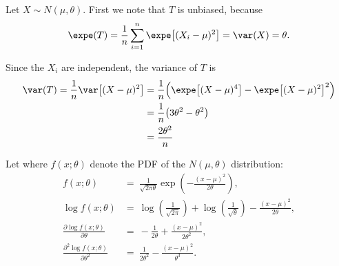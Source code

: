 \begin{solution}
Let $X\sim N(\mu,\theta)$. First we note that $T$ is unbiased, because
\[
\expe(T) = \frac{1}{n}\sum_{i=1}^{n} \expe\big[(X_i-\mu)^2\big] = \var(X) = \theta.
\]

Since the $X_i$ are independent, the variance of $T$ is
\begin{align*}
\var(T) 
	= \frac{1}{n}\var\big[(X-\mu)^2\big]
	& = \frac{1}{n}\Big(\expe\big[(X-\mu)^4\big] - \expe\big[(X-\mu)^2\big]^2\Big) \\
	& = \frac{1}{n}\big(3\theta^2 - \theta^2\big) \\
	& = \frac{2\theta^2}{n}
\end{align*}

%
Let where $f(x;\theta)$ denote the PDF of the $N(\mu,\theta)$ distribution:
%
\begin{align*}
f(x;\theta) 
	& = \ \frac{1}{\sqrt{2\pi\theta}}\exp\left(-\frac{(x-\mu)^2}{2\theta}\right), \\[2ex]
\log f(x;\theta)
	& = \ \log\left(\frac{1}{\sqrt{2\pi}}\right) + \log\left(\frac{1}{\sqrt{\theta}}\right)  - \frac{(x-\mu)^2}{2\theta}, \\[2ex]
\frac{\partial\log f(x;\theta)}{\partial\theta}
	& = \ -\frac{1}{2\theta} + \frac{(x-\mu)^2}{2\theta^2}, \\[2ex]
\frac{\partial^2\log f(x;\theta)}{\partial\theta^2}
	& = \ \frac{1}{2\theta^2} - \frac{(x-\mu)^2}{\theta^3}.
\end{align*}


\end{solution}
